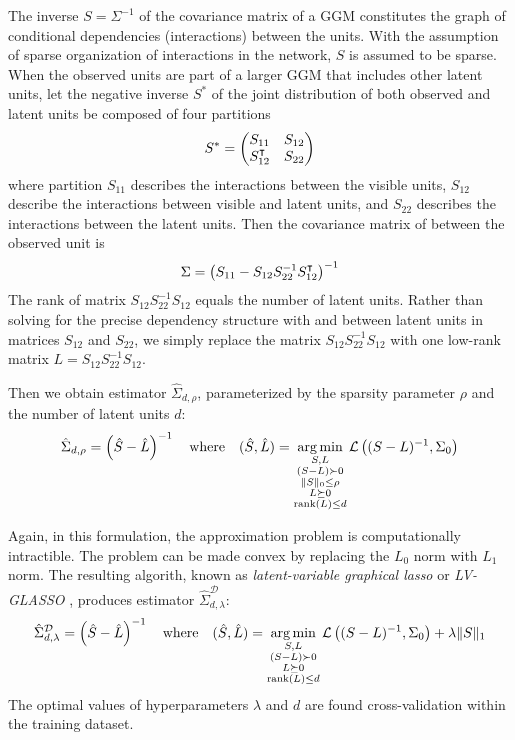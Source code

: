 The inverse $S=\Sigma^{-1}$ of the covariance matrix of a GGM constitutes the graph of conditional dependencies (interactions) between the units.  With the assumption of sparse organization of interactions in the network, $S$ is assumed to be sparse.  When the observed units are part of a larger GGM that includes other latent units, let the negative inverse $S^*$ of the joint distribution of both observed and latent units be composed of four partitions
\begin{equation}
S^* = 
\begin{pmatrix}
S_{11} & S_{12} \\
S_{12}^\intercal & S_{22} 
\end{pmatrix}
\end{equation}
where partition $S_{11}$ describes the interactions between the visible units, $S_{12}$ describe the interactions between visible and latent units, and $S_{22}$ describes the interactions between the latent units. 
Then the covariance matrix of between the observed unit is 
\begin{equation}
\Sigma = \left(S_{11} - S_{12}S_{22}^{-1}S_{12}^\intercal\right)^{-1}
\end{equation} 
The rank of matrix $S_{12}S_{22}^{-1}S_{12}$ equals the number of latent units. Rather than solving for the precise dependency structure with and between latent units in matrices $S_{12}$ and $S_{22}$, we simply replace the matrix $ S_{12}S_{22}^{-1}S_{12}$ with one low-rank matrix $L= S_{12}S_{22}^{-1}S_{12}$.

Then we obtain estimator $\hat\Sigma_{d,\rho}$, parameterized by the sparsity parameter $\rho$ and  the number of latent units $d$:
\begin{equation}
\hat\Sigma_{d,\rho} = \left(\hat S-\hat L\right)^{-1}
\quad\mbox{where}\quad
(\hat S, \hat L) = \operatorname*{arg\,min}\limits_{\substack{S,L\\ (S-L)\succ 0 \\ \|S\|_0\le\rho \\ L\succeq 0 \\ \operatorname{rank}(L) \le d}} \mathcal L\left((S-L)^{-1},\Sigma_0\right)
\end{equation}

Again, in this formulation, the approximation problem is computationally intractible.  The problem can be made convex by replacing the $L_0$ norm with $L_1$ norm. The resulting algorith, known as \emph{latent-variable graphical lasso} or \emph{LV-GLASSO} \cite{Chandrasekaran:2010,Ma:2013}, produces estimator $\hat\Sigma_{d,\lambda}^{\mathcal D}$:
\begin{equation}
\hat\Sigma_{d,\lambda} ^{\mathcal D} = \left(\hat S-\hat L\right)^{-1}
\quad\mbox{where}\quad
(\hat S, \hat L) = \operatorname*{arg\,min}\limits_{\substack{ S,L \\ (S-L)\succ 0 \\ L\succeq 0 \\ \operatorname{rank}(L) \le d}} \mathcal L\left((S-L)^{-1},\Sigma_0\right) + \lambda \| S \|_1 
\end{equation}
The optimal values of hyperparameters $\lambda$ and $d$ are found cross-validation within the training dataset.
